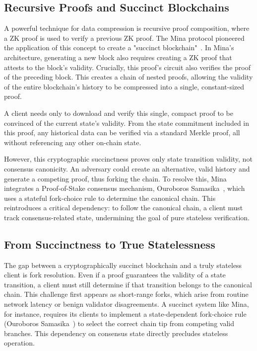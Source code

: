 \documentclass[runningheads]{llncs}
\begin{document}
\subsection{Recursive Proofs and Succinct Blockchains}
A powerful technique for data compression is recursive proof composition, where a ZK proof is used to verify a previous ZK proof. The Mina protocol pioneered the application of this concept to create a "succinct blockchain"~\cite{Bonneau2020Coda}. In Mina's architecture, generating a new block also requires creating a ZK proof that attests to the block's validity. Crucially, this proof's circuit also verifies the proof of the preceding block. This creates a chain of nested proofs, allowing the validity of the entire blockchain's history to be compressed into a single, constant-sized proof.

A client needs only to download and verify this single, compact proof to be convinced of the current state's validity. From the state commitment included in this proof, any historical data can be verified via a standard Merkle proof, all without referencing any other on-chain state.

However, this cryptographic succinctness proves only state transition validity, not consensus canonicity. An adversary could create an alternative, valid history and generate a competing proof, thus forking the chain. To resolve this, Mina integrates a Proof-of-Stake consensus mechanism, Ouroboros Samasika~\cite{Badertscher2018Samasika}, which uses a stateful fork-choice rule to determine the canonical chain. This reintroduces a critical dependency: to follow the canonical chain, a client must track consensus-related state, undermining the goal of pure stateless verification.

\subsection{From Succinctness to True Statelessness}
\label{sec:towards_stateless}

The gap between a cryptographically succinct blockchain and a truly stateless client is fork resolution. Even if a proof guarantees the validity of a state transition, a client must still determine if that transition belongs to the canonical chain. This challenge first appears as short-range forks, which arise from routine network latency or benign validator disagreements. A succinct system like Mina, for instance, requires its clients to implement a state-dependent fork-choice rule (Ouroboros Samasika~\cite{Badertscher2018Samasika,Bonneau2020Coda}) to select the correct chain tip from competing valid branches. This dependency on consensus state directly precludes stateless operation.
\end{document}
